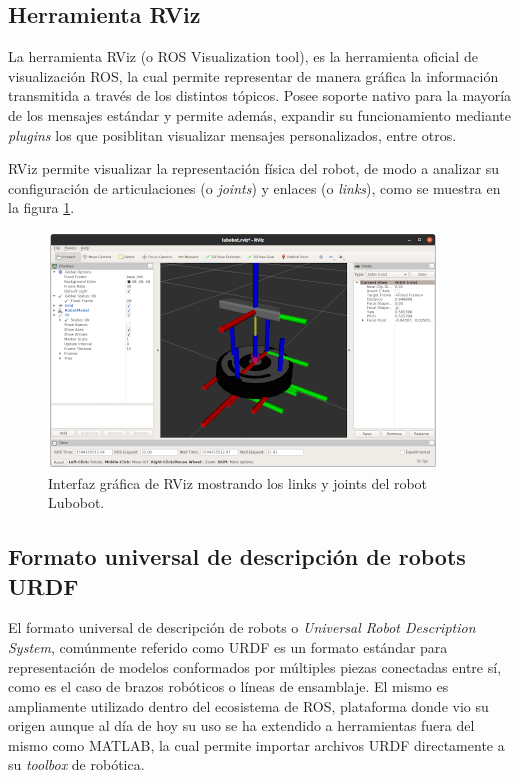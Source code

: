 \subsection{Herramienta RViz}

La herramienta RViz (o ROS Visualization tool), es la herramienta oficial de visualización ROS, la cual permite representar de manera gráfica la información transmitida a través de los distintos tópicos. Posee soporte nativo para la mayoría de los mensajes estándar y permite además, expandir su funcionamiento mediante \textit{plugins} los que posiblitan visualizar mensajes personalizados, entre otros.

RViz permite visualizar la representación física del robot, de modo a analizar su configuración de articulaciones (o \textit{joints}) y enlaces (o \textit{links}), como se muestra en la figura \ref{fig:rviz}.

\begin{figure}[ht]
    \centering
    \includegraphics{./Figures/rviz.png}
    \caption{Interfaz gráfica de RViz mostrando los links y joints del robot Lubobot.}
    \label{fig:rviz}
\end{figure}

\subsection{Formato universal de descripción de robots URDF}

El formato universal de descripción de robots o \textit{Universal Robot Description System}, comúnmente referido como URDF es un formato estándar para representación de modelos conformados por múltiples piezas conectadas entre sí, como es el caso de brazos robóticos o líneas de ensamblaje. El mismo es ampliamente utilizado dentro del ecosistema de ROS, plataforma donde vio su origen aunque al día de hoy su uso se ha extendido a herramientas fuera del mismo como MATLAB, la cual permite importar archivos URDF directamente a su \textit{toolbox} de robótica.

